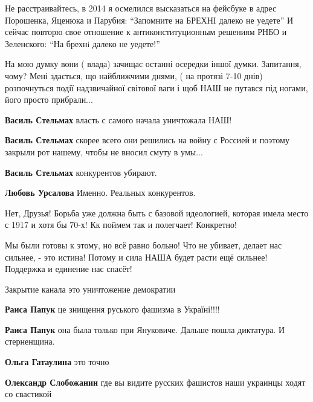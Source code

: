 \begin{itemize}

Не расстраивайтесь, в 2014 я осмелился высказаться на фейсбуке в адрес
Порошенка, Яценюка и Парубия: \enquote{Запомните на БРЕХНI далеко не уедете} И сейчас
повторю свое отношение к антиконституционным решениям РНБО и Зеленского: \enquote{На
брехнi далеко не уедете!}


На мою думку вони ( влада) зачищає останні осередки іншої думки. Запитання,
чому? Мені здається, що найближчими днями, ( на протязі 7-10 днів) розпочнуться
події надзвичайної світової ваги і щоб НАШ не путався під ногами, його просто
прибрали...

\begin{itemize} %
\textbf{Василь Стельмах} власть с самого начала уничтожала НАШ!

\textbf{Василь Стельмах} скорее всего они решились на войну с Россией и поэтому закрыли рот нашему, чтобы не вносил смуту в умы...

\textbf{Василь Стельмах} конкурентов убирают.

\textbf{Любовь Урсалова} Именно. Реальных конкурентов.
\end{itemize} %


Нет, Друзья! Борьба уже должна быть с базовой идеологией, которая имела место с
1917 и хотя бы 70-х! Кк поймем так и полегчает! Конкретно!


Мы были готовы к этому, но всё равно больно!
Что не убивает, делает нас сильнее, - это истина!
Потому и сила НАША будет расти ещё сильнее!
Поддержка и единение нас спасёт!

Закрытие канала это уничтожение демократии

\begin{itemize} %
\textbf{Раиса Папук} це знищення руського фашизма в Україні!!!!

\textbf{Раиса Папук} она была только при Януковиче. Дальше пошла диктатура. И стерненщина.

\textbf{Ольга Гатаулина} это точно

\textbf{Олександр Слобожанин} где вы видите русских фашистов наши украинцы ходят со свастикой


\end{itemize}
\end{itemize}
